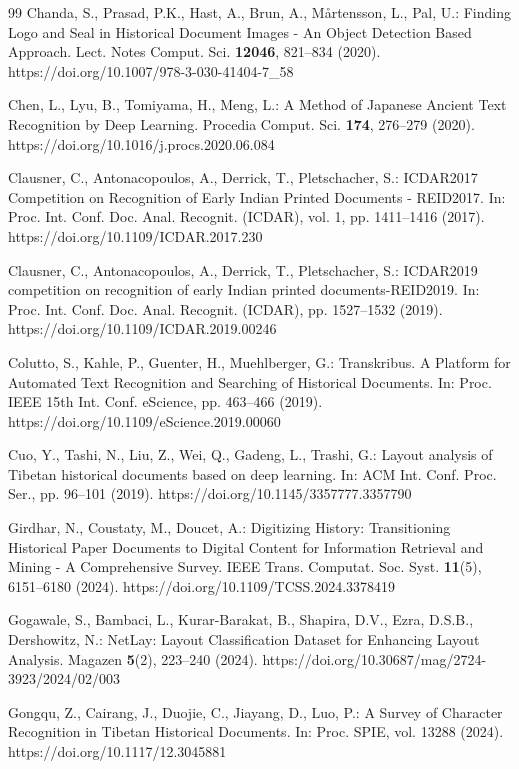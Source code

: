\documentclass[pdflatex,sn-mathphys-num]{sn-jnl}
\begin{document}
\begin{thebibliography}{99}
Chanda, S., Prasad, P.K., Hast, A., Brun, A., Mårtensson, L., Pal, U.: Finding Logo and Seal in Historical Document Images - An Object Detection Based Approach. Lect. Notes Comput. Sci. \textbf{12046}, 821--834 (2020). https://doi.org/10.1007/978-3-030-41404-7\_58

Chen, L., Lyu, B., Tomiyama, H., Meng, L.: A Method of Japanese Ancient Text Recognition by Deep Learning. Procedia Comput. Sci. \textbf{174}, 276--279 (2020). https://doi.org/10.1016/j.procs.2020.06.084

Clausner, C., Antonacopoulos, A., Derrick, T., Pletschacher, S.: ICDAR2017 Competition on Recognition of Early Indian Printed Documents - REID2017. In: Proc. Int. Conf. Doc. Anal. Recognit. (ICDAR), vol. 1, pp. 1411--1416 (2017). https://doi.org/10.1109/ICDAR.2017.230

Clausner, C., Antonacopoulos, A., Derrick, T., Pletschacher, S.: ICDAR2019 competition on recognition of early Indian printed documents-REID2019. In: Proc. Int. Conf. Doc. Anal. Recognit. (ICDAR), pp. 1527--1532 (2019). https://doi.org/10.1109/ICDAR.2019.00246

Colutto, S., Kahle, P., Guenter, H., Muehlberger, G.: Transkribus. A Platform for Automated Text Recognition and Searching of Historical Documents. In: Proc. IEEE 15th Int. Conf. eScience, pp. 463--466 (2019). https://doi.org/10.1109/eScience.2019.00060

Cuo, Y., Tashi, N., Liu, Z., Wei, Q., Gadeng, L., Trashi, G.: Layout analysis of Tibetan historical documents based on deep learning. In: ACM Int. Conf. Proc. Ser., pp. 96--101 (2019). https://doi.org/10.1145/3357777.3357790

Girdhar, N., Coustaty, M., Doucet, A.: Digitizing History: Transitioning Historical Paper Documents to Digital Content for Information Retrieval and Mining - A Comprehensive Survey. IEEE Trans. Computat. Soc. Syst. \textbf{11}(5), 6151--6180 (2024). https://doi.org/10.1109/TCSS.2024.3378419

Gogawale, S., Bambaci, L., Kurar-Barakat, B., Shapira, D.V., Ezra, D.S.B., Dershowitz, N.: NetLay: Layout Classification Dataset for Enhancing Layout Analysis. Magazen \textbf{5}(2), 223--240 (2024). https://doi.org/10.30687/mag/2724-3923/2024/02/003

Gongqu, Z., Cairang, J., Duojie, C., Jiayang, D., Luo, P.: A Survey of Character Recognition in Tibetan Historical Documents. In: Proc. SPIE, vol. 13288 (2024). https://doi.org/10.1117/12.3045881


\end{thebibliography}
\end{document}
